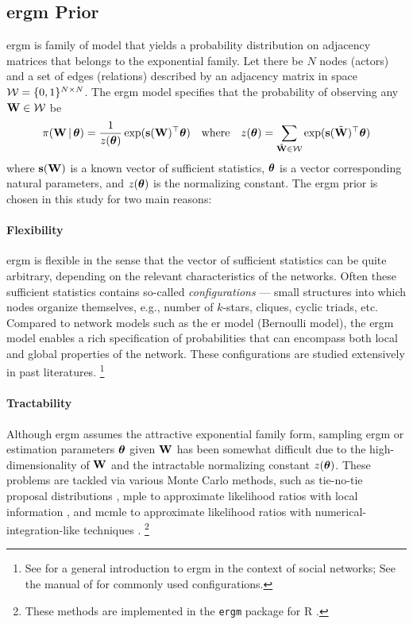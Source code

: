 \documentclass[a4paper]{article}
\begin{document}
\subsection{\gls{ergm} Prior}\label{sec:ergm-prior}

\gls{ergm} is family of model that yields a probability distribution
on adjacency matrices that belongs to the exponential family.
Let there be $N$ nodes (actors) and a set of edges (relations)
described by an adjacency matrix in space $\mathcal{W}=\{0,1\}^{N\times N}$.
The \gls{ergm} model specifies that the probability of observing any $\mathbf{W}\in\mathcal{W}$ be
\begin{align*}
	\pi(\mathbf{W}\,|\,\boldsymbol{\theta}) = \frac1{z(\boldsymbol{\theta})} \exp(\mathbf{s}(\mathbf{W})^\top\boldsymbol{\theta})
	\quad\text{where}\quad
	z(\boldsymbol{\theta}) = \sum_{\tilde{\mathbf{W}}\in\mathcal{W}} \exp(\mathbf{s}(\tilde{\mathbf{W}})^\top\boldsymbol{\theta})
\end{align*}
where
$\mathbf{s}(\mathbf{W})$ is a known vector of sufficient statistics,
$\boldsymbol{\theta}$ is a vector corresponding natural parameters, and
$z(\boldsymbol{\theta})$ is the normalizing constant.
The \gls{ergm} prior is chosen in this study for two main reasons:

\paragraph{Flexibility}

\gls{ergm} is flexible in the sense that the vector of sufficient statistics can be quite arbitrary,
depending on the relevant characteristics of the networks.
Often these sufficient statistics contains so-called
\emph{configurations} --- small structures into which nodes organize themselves,
e.g., number of $k$-stars, cliques, cyclic triads, etc.
Compared to network models such as the \gls{er} model (Bernoulli model),
the \gls{ergm} model enables a rich specification of probabilities
that can encompass both local and global properties of the network.
These configurations are studied extensively in past literatures.
\footnote{
	See \cite{robins-pattison-kalish-dean-2007}
	for a general introduction to \gls{ergm} in the context of social networks;
	See the manual of \cite{ergm} for commonly used configurations.
}

\paragraph{Tractability}

Although \gls{ergm} assumes the attractive exponential family form,
sampling \gls{ergm} or estimation parameters $\boldsymbol{\theta}$ given $\mathbf{W}$ has been somewhat difficult
due to the high-dimensionality of $\mathbf{W}$ and the intractable normalizing constant $z(\boldsymbol{\theta})$.
These problems are tackled via various Monte Carlo methods, such as
tie-no-tie proposal distributions \parencite{hunter-handcock-2008},
\gls{mple} to approximate likelihood ratios with local information \parencite{strauss-ikeda-1990}, and
\gls{mcmle} to approximate likelihood ratios
with numerical-integration-like techniques \parencite{geyer-thompson-1992}.
\footnote{
	These methods are implemented in the \Verb"ergm" package for R \parencite{ergm}.
}
\end{document}
